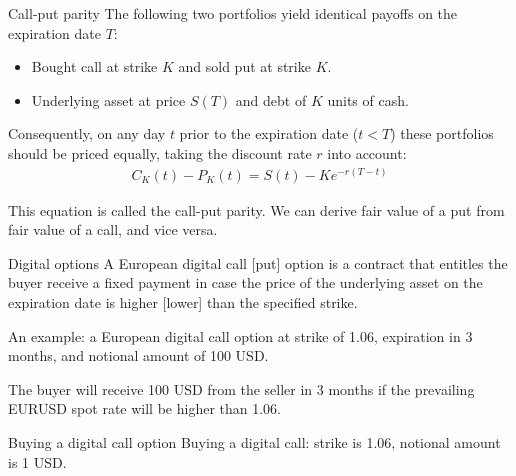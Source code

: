 \documentclass{beamer}
\begin{document}
\begin{frame}{Call-put parity}
\justify
The following two portfolios yield identical payoffs on the expiration date $T$:
\begin{itemize}
\justifying
\item Bought call at strike $K$ and sold put at strike $K$.
\item Underlying asset at price $S(T)$ and debt of $K$ units of cash.
\end{itemize}

\justify
Consequently, on any day $t$ prior to the expiration date ($t<T$) these portfolios should be priced equally, taking the discount rate $r$ into account:
\begin{align*}
C_K(t) - P_K(t) = S(t) - Ke^{-r(T-t)}
\end{align*}

\justify
This equation is called the \alert{call-put parity}. We can derive fair value of a put from fair value of a call, and vice versa.\end{frame}



\begin{frame}{Digital options}
\justify
A European \alert{digital call [put]} option is a contract that entitles the buyer receive a fixed payment in case the price of the underlying asset on the expiration date is higher [lower] than the specified strike.

\justify
An example: a European digital call option at strike of 1.06, expiration in 3 months, and notional amount of 100 USD. 

\justify
The buyer will receive 100 USD from the seller in 3 months if the prevailing EURUSD spot rate will be higher than 1.06.
\end{frame}



\begin{frame}{Buying a digital call option}
\justifying
Buying a digital call: strike is 1.06, notional amount is 1 USD.

\justifying
\centering
\end{frame}
\end{document}
